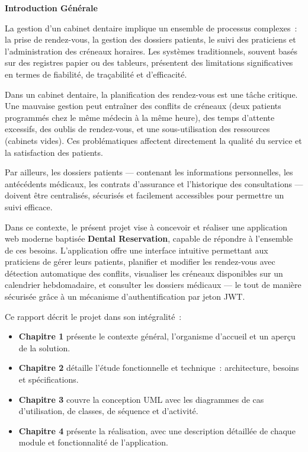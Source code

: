 \clearpage


\vspace*{2cm}

\begin{center}
{\fontsize{24}{29}\selectfont\bfseries Introduction Générale}
\end{center}

\vspace{1.5cm}

La gestion d'un cabinet dentaire implique un ensemble de processus complexes~: la prise de rendez-vous, la gestion des dossiers patients, le suivi des praticiens et l'administration des créneaux horaires. Les systèmes traditionnels, souvent basés sur des registres papier ou des tableurs, présentent des limitations significatives en termes de fiabilité, de traçabilité et d'efficacité.

Dans un cabinet dentaire, la planification des rendez-vous est une tâche critique. Une mauvaise gestion peut entraîner des conflits de créneaux (deux patients programmés chez le même médecin à la même heure), des temps d'attente excessifs, des oublis de rendez-vous, et une sous-utilisation des ressources (cabinets vides). Ces problématiques affectent directement la qualité du service et la satisfaction des patients.

Par ailleurs, les dossiers patients --- contenant les informations personnelles, les antécédents médicaux, les contrats d'assurance et l'historique des consultations --- doivent être centralisés, sécurisés et facilement accessibles pour permettre un suivi efficace.

Dans ce contexte, le présent projet vise à concevoir et réaliser une application web moderne baptisée \textbf{Dental Reservation}, capable de répondre à l'ensemble de ces besoins. L'application offre une interface intuitive permettant aux praticiens de gérer leurs patients, planifier et modifier les rendez-vous avec détection automatique des conflits, visualiser les créneaux disponibles sur un calendrier hebdomadaire, et consulter les dossiers médicaux --- le tout de manière sécurisée grâce à un mécanisme d'authentification par jeton JWT.

Ce rapport décrit le projet dans son intégralité~:

\begin{itemize}
    \item \textbf{Chapitre 1} présente le contexte général, l'organisme d'accueil et un aperçu de la solution.
    \item \textbf{Chapitre 2} détaille l'étude fonctionnelle et technique~: architecture, besoins et spécifications.
    \item \textbf{Chapitre 3} couvre la conception UML avec les diagrammes de cas d'utilisation, de classes, de séquence et d'activité.
    \item \textbf{Chapitre 4} présente la réalisation, avec une description détaillée de chaque module et fonctionnalité de l'application.
\end{itemize}

\clearpage
